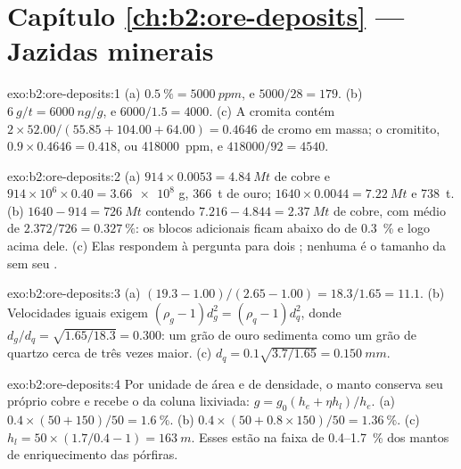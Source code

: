 \section*{Capítulo \ref{ch:b2:ore-deposits} --- Jazidas minerais}

\begin{solution}{exo:b2:ore-deposits:1}
(a) $\qty{0.5}{\percent} = \qty{5000}{ppm}$, e $5000/28 = 179$. (b) $\qty{6}{g/t} = \qty{6000}{ng/g}$,
e $6000/1.5 = 4000$. (c) A cromita contém $2 \times 52.00/(55.85 + 104.00 + 64.00) = 0.4646$ de
cromo em massa; o cromitito, $0.9 \times 0.4646 = 0.418$, ou \qty{418000}{ppm}, e
$418000/92 = 4540$.
\end{solution}

\begin{solution}{exo:b2:ore-deposits:2}
(a) $914 \times 0.0053 = \qty{4.84}{Mt}$ de cobre e $914 \times 10^6 \times 0.40 = \num{3.66e8}$ g,
\qty{366}{t} de ouro; $1640 \times 0.0044 = \qty{7.22}{Mt}$ e \qty{738}{t}. (b) $1640 - 914 =
\qty{726}{Mt}$ contendo $7.216 - 4.844 = \qty{2.37}{Mt}$ de cobre, com  médio de
$2.372/726 = \qty{0.327}{\percent}$: os blocos adicionais ficam abaixo do  de \qty{0.3}{\percent}
e logo acima dele. (c) Elas respondem à pergunta para dois ; nenhuma é o tamanho da
 sem seu .
\end{solution}

\begin{solution}{exo:b2:ore-deposits:3}
(a) $(19.3 - 1.00)/(2.65 - 1.00) = 18.3/1.65 = 11.1$. (b) Velocidades iguais exigem $(\rho_g - 1)d_g^2 =
(\rho_q - 1)d_q^2$, donde $d_g/d_q = \sqrt{1.65/18.3} = 0.300$: um grão de ouro sedimenta como um grão de
quartzo cerca de três vezes maior. (c) $d_q = 0.1\sqrt{3.7/1.65} = \qty{0.150}{mm}$.
\end{solution}

\begin{solution}{exo:b2:ore-deposits:4}
Por unidade de área e de densidade, o manto conserva seu próprio cobre e recebe o da coluna
lixiviada: $g = g_0(h_e + \eta h_l)/h_e$. (a) $0.4 \times (50 + 150)/50 = \qty{1.6}{\percent}$.
(b) $0.4 \times (50 + 0.8 \times 150)/50 = \qty{1.36}{\percent}$. (c) $h_l = 50 \times (1.7/0.4 - 1)
= \qty{163}{m}$. Esses  estão na faixa de 0.4--\qty{1.7}{\percent} dos mantos de enriquecimento das
 pórfiras.
\end{solution}


